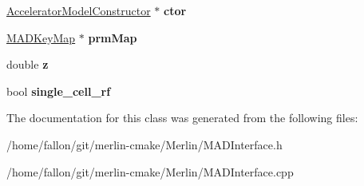 \begin{DoxyCompactItemize}
\item 
\mbox{\label{classMADInterface_a1e401441c398fed4d27f063d04e16894}} 
\hyperlink{classAcceleratorModelConstructor}{Accelerator\+Model\+Constructor} $\ast$ {\bfseries ctor}
\item 
\mbox{\label{classMADInterface_a2a001e8bd03ad7db347ba10aa875a529}} 
\hyperlink{classMADKeyMap}{M\+A\+D\+Key\+Map} $\ast$ {\bfseries prm\+Map}
\item 
\mbox{\label{classMADInterface_af333f3fffe3d1c34dae3f51726bc00aa}} 
double {\bfseries z}
\item 
\mbox{\label{classMADInterface_ab29d618ca9b6420f4d10672fc334a8ca}} 
bool {\bfseries single\+\_\+cell\+\_\+rf}
\end{DoxyCompactItemize}


The documentation for this class was generated from the following files\+:\begin{DoxyCompactItemize}
\item 
/home/fallon/git/merlin-\/cmake/\+Merlin/M\+A\+D\+Interface.\+h\item 
/home/fallon/git/merlin-\/cmake/\+Merlin/M\+A\+D\+Interface.\+cpp\end{DoxyCompactItemize}
